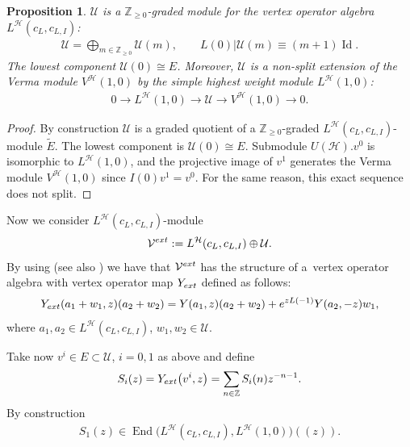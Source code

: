\documentclass[11pt]{article}
\numberwithin{equation}{section}
\newtheorem{Proposition}[Theorem]{Proposition}
 { \theoremstyle{definition}
\newtheorem{Example}[Theorem]{Example}
\newtheorem{Remark}[Theorem]{Remark} }
\newcommand{\Zp}{{\mathbb Z}_{\geq 0} }
\newcommand{\Z}{\mathbb Z}
\newcommand{\HVir}{\mathcal H}
\begin{document}
\begin{Proposition}
$\mathcal U$ is a $\Zp$-graded module for the vertex operator algebra $L^{\HVir} (c_L, c_{L,I} )$:
\begin{gather*}
\mathcal U = \bigoplus _{m \in {\Zp} } \mathcal U (m), \qquad L(0) \vert \mathcal U(m) \equiv (m+1) \operatorname{Id}.
\end{gather*}
The lowest component $\mathcal U (0) \cong E$. Moreover, $\mathcal U$ is a non-split extension of the Verma module $V^{\HVir} (1,0)$ by the simple highest weight module $L^{\HVir} (1,0)$:
 \begin{gather*}
 0 \rightarrow L^{\HVir} (1,0) \rightarrow \mathcal U \rightarrow V^{\HVir} (1,0 ) \rightarrow 0.
 \end{gather*}
 \end{Proposition}
 \begin{proof}
By construction $\mathcal U $ is a graded quotient of a $\Z_{\ge 0}$-graded $L^{\HVir}(c_L, c_{L,I})$-module $\widetilde E$. The lowest component is $\mathcal U (0) \cong E$. Submodule $U(\HVir).v^0$ is isomorphic to $L^{\HVir}(1,0)$, and the projective image of $v^1$ generates the Verma module $V^{\HVir}(1,0)$ since $I(0)v^1=v^0$. For the same reason, this exact sequence does not split.
\end{proof}

Now we consider $L^{\HVir}(c_L, c_{L,I} )$-module
\begin{gather*}
\mathcal V^{\rm ext}:= L^{\HVir}(c_L, c_{L,I} ) \oplus \mathcal U.
\end{gather*}
By using \cite[Theorem 4.8.1]{LL} (see also \cite{AdM-selecta,Li1}) we have that $ \mathcal V^{\rm ext}$ has the structure of a~vertex operator algebra with vertex operator map $Y_{\rm ext}$ def\/ined as follows:{\samepage
\begin{gather*}
Y_{\rm ext} ( a_1 + w_1 , z ) (a_2 + w_2) = Y(a_1, z) (a_2+w_2) + e^{z L(-1)} Y (a_2 ,-z ) w_1,
\end{gather*}
where $a_1, a_2 \in L^{\HVir}(c_L, c_{L,I} )$, $ w_1, w_2 \in \mathcal U$.}

Take now $v^ i \in E \subset \mathcal U$, $i=0,1$ as above and def\/ine
\begin{gather*}
S_i (z) = Y_{\rm ext} \big(v^i, z\big) = \sum _{n \in \Z} S_i (n) z^{-n-1}.
\end{gather*}
By construction
\begin{gather*}
S_1 (z) \in \operatorname{End} \big( L^{\HVir} (c_L,c_{L,I}), L^{\HVir}(1,0) \big) ((z)).
\end{gather*}
\end{document}

